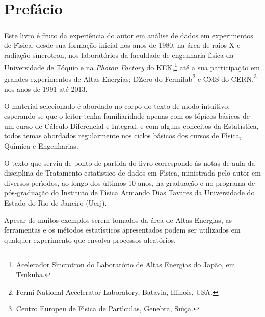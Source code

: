\chapter*{Pref\'{a}cio}
{}%
%

\baselineskip=14pt

\vspace*{-0.7cm}
\paragraph*{}
Este livro \'{e} fruto da experi\^{e}ncia do autor em an\'{a}lise de dados em experimentos de F\'{\i}sica, desde  sua forma\c{c}\~{a}o inicial nos anos de 1980, na \'{a}rea de raios X e radia\c{c}\~{a}o s\'{\i}ncrotron, nos laborat\'{o}rios  da faculdade de engenharia f\'{\i}sica da Universidade de T\'{o}quio e na {\it Photon Factory} do KEK,\footnote{Acelerador  S\'{\i}ncrotron do  Laborat\'{o}rio de Altas Energias do Jap\~{a}o, em Tsukuba.} at\'{e} a sua participa\c{c}\~{a}o em  grandes experimentos de Altas Energias; DZero  do Fermilab\footnote{Fermi National Accelerator Laboratory, Batavia, Illinois, USA.}  e CMS do CERN,\footnote{Centro Europeu de F\'{\i}sica de Part\'{\i}culas, Genebra, Su\'{\i}\c{c}a.} nos anos de 1991 at\'{e} 2013.

 O material selecionado \'{e} abordado no corpo do texto de modo intuitivo, es\-pe\-ran\-do-se que o leitor tenha familiaridade apenas com os t\'{o}picos b\'{a}sicos de um curso de C\'{a}lculo Diferencial e Integral,  e com alguns conceitos da Estat\'{\i}stica,  todos temas abordados regularmente nos ciclos b\'{a}sicos dos cursos de F\'{\i}sica, Qu\'{\i}mica  e Engenharias.

O texto que serviu de ponto de partida do livro corresponde \`{a}s notas de aula da disciplina de Tratamento estat\'{\i}stico de dados em F\'{\i}sica, mi\-nistrada pelo autor em diversos per\'{\i}odos, ao longo dos \'{u}ltimos 10 anos, na gradua\c{c}\~{a}o e no programa de p\'{o}s-gradua\c{c}\~{a}o do Instituto de F\'{\i}sica Armando Dias Tavares da  Universidade do Estado do Rio de Janeiro (Uerj).
	
Apesar de muitos exemplos serem tomados da \'{a}rea de Altas Energias, as ferramentas e os  m\'{e}todos estat\'{\i}sticos apresentados podem ser utilizados em qualquer experimento que envolva processos aleat\'{o}rios.

